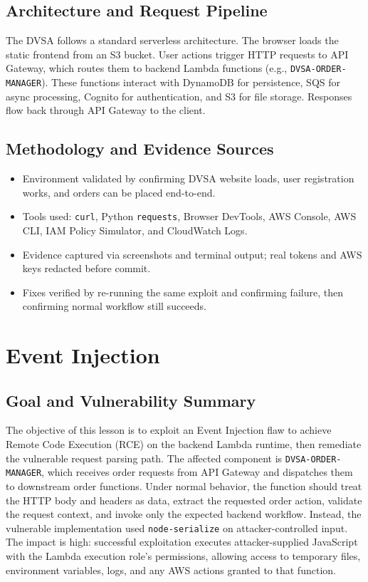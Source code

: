 \documentclass[12pt]{report}
\begin{document}
\section*{Architecture and Request Pipeline}
The DVSA follows a standard serverless architecture. The browser loads the static frontend from an S3 bucket. User actions trigger HTTP requests to API Gateway, which routes them to backend Lambda functions (e.g., \texttt{DVSA-ORDER-MANAGER}). These functions interact with DynamoDB for persistence, SQS for async processing, Cognito for authentication, and S3 for file storage. Responses flow back through API Gateway to the client.

\section*{Methodology and Evidence Sources}
\begin{itemize}
  \item Environment validated by confirming DVSA website loads, user registration works, and orders can be placed end-to-end.
  \item Tools used: \texttt{curl}, Python \texttt{requests}, Browser DevTools, AWS Console, AWS CLI, IAM Policy Simulator, and CloudWatch Logs.
  \item Evidence captured via screenshots and terminal output; real tokens and AWS keys redacted before commit.
  \item Fixes verified by re-running the same exploit and confirming failure, then confirming normal workflow still succeeds.
\end{itemize}

\clearpage
{}

\chapter{Event Injection}

\section{Goal and Vulnerability Summary}
The objective of this lesson is to exploit an Event Injection flaw to achieve Remote Code Execution (RCE) on the backend Lambda runtime, then remediate the vulnerable request parsing path. The affected component is \texttt{DVSA-ORDER-MANAGER}, which receives order requests from API Gateway and dispatches them to downstream order functions. Under normal behavior, the function should treat the HTTP body and headers as data, extract the requested order action, validate the request context, and invoke only the expected backend workflow. Instead, the vulnerable implementation used \texttt{node-serialize} on attacker-controlled input. The impact is high: successful exploitation executes attacker-supplied JavaScript with the Lambda execution role's permissions, allowing access to temporary files, environment variables, logs, and any AWS actions granted to that function.
\end{document}
